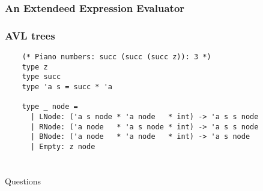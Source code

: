 \documentclass[mathserif,xcolor=svgnames]{beamer}
\renewcommand{\_}{\mathunderscore}
\begin{document}
\begin{frame}[fragile]
  \frametitle{An Extendeed Expression Evaluator}
  
\end{frame}


\begin{frame}[fragile]
  \frametitle{AVL trees}
  \begin{lstlisting}
    (* Piano numbers: succ (succ (succ z)): 3 *)
    type z
    type succ
    type 'a s = succ * 'a

    type _ node =
      | LNode: ('a s node * 'a node   * int) -> 'a s s node
      | RNode: ('a node   * 'a s node * int) -> 'a s s node
      | BNode: ('a node   * 'a node   * int) -> 'a s node
      | Empty: z node
  \end{lstlisting}

\end{frame}

\section{}
\begin{frame}
  \center \LARGE Questions
\end{frame}
\end{document}
